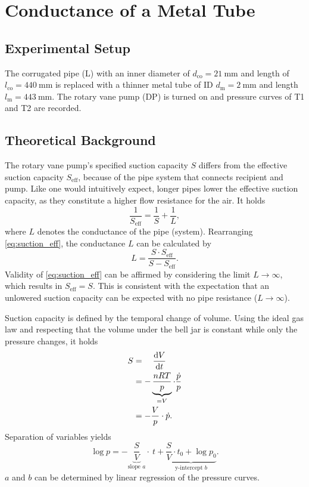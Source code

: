 \chapter{Conductance of a Metal Tube}
\section{Experimental Setup}
The corrugated pipe (L) with an inner diameter of $d_\text{co}=\SI{21}{\milli\meter}$ and length of $l_\text{co}=\SI{440}{\milli\meter}$ is replaced with a thinner metal tube of ID $d_\text{m}=\SI{2}{\milli\meter}$ and length $l_\text{m}=\SI{443}{\milli\meter}$.
The rotary vane pump (DP) is turned on and pressure curves of T1 and T2 are recorded.

\section{Theoretical Background}
The rotary vane pump's specified suction capacity $S$ differs from the effective suction capacity $S_\text{eff}$, because of the pipe system that connects recipient and pump.
Like one would intuitively expect, longer pipes lower the effective suction capacity, as they constitute a higher flow resistance for the air.
It holds
\begin{equation}\label{eq:suction_eff}
	\frac{1}{S_\text{eff}}=\frac{1}{S}+\frac{1}{L},
\end{equation}
where $L$ denotes the conductance of the pipe (system).
Rearranging \autoref{eq:suction_eff}, the conductance $L$ can be calculated by
\begin{equation}\label{eq:conductance}
	L=\frac{S\cdot S_\text{eff}}{S-S_\text{eff}}.
\end{equation}
Validity of \autoref{eq:suction_eff} can be affirmed by considering the limit $L\rightarrow\infty$, which results in $S_\text{eff}=S$.
This is consistent with the expectation that an unlowered suction capacity can be expected with no pipe resistance ($L\rightarrow\infty$).

Suction capacity is defined by the temporal change of volume. Using the ideal gas law and respecting that the volume under the bell jar is constant while only the pressure changes, it holds
\begin{align*}
	S &=\quad \frac{\text{d} V}{\text{d} t} \\
	&= -\underbrace{\frac{nRT}{p}}_{=V}\cdot\frac{\dot{p}}{p} \\
	&=-\frac{V}{p}\cdot\dot{p}.
\end{align*}
Separation of variables yields
\begin{equation}
	\log{p} = -\underbrace{\frac{S}{V}}_{\text{slope } a}\cdot\ t + \underbrace{\frac{S}{V}\cdot t_0 + \log{p_0}}_{\text{y-intercept } b}.
\end{equation}
$a$ and $b$ can be determined by linear regression of the pressure curves.

